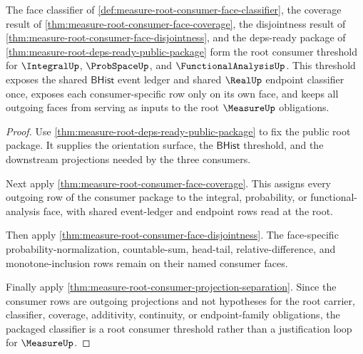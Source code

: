 \begin{theorem}
\label{thm:measure-root-cross-consumer-threshold-package}
The face classifier of
\autoref{def:measure-root-consumer-face-classifier}, the coverage result of
\autoref{thm:measure-root-consumer-face-coverage}, the disjointness result of
\autoref{thm:measure-root-consumer-face-disjointness}, and the deps-ready
package of \autoref{thm:measure-root-deps-ready-public-package} form the root
consumer threshold for $\IntegralUp$, $\ProbSpaceUp$, and
$\FunctionalAnalysisUp$. This threshold exposes the shared $\mathsf{BHist}$
event ledger and shared $\RealUp$ endpoint classifier once, exposes each
consumer-specific row only on its own face, and keeps all outgoing faces from
serving as inputs to the root $\MeasureUp$ obligations.
\end{theorem}
\begin{proof}
Use \autoref{thm:measure-root-deps-ready-public-package} to fix the public
root package. It supplies the orientation surface, the $\mathsf{BHist}$
threshold, and the downstream projections needed by the three consumers.

Next apply \autoref{thm:measure-root-consumer-face-coverage}. This assigns
every outgoing row of the consumer package to the integral, probability, or
functional-analysis face, with shared event-ledger and endpoint rows read at
the root.

Then apply \autoref{thm:measure-root-consumer-face-disjointness}. The
face-specific probability-normalization, countable-sum, head-tail,
relative-difference, and monotone-inclusion rows remain on their named
consumer faces.

Finally apply
\autoref{thm:measure-root-consumer-projection-separation}. Since the
consumer rows are outgoing projections and not hypotheses for the root
carrier, classifier, coverage, additivity, continuity, or endpoint-family
obligations, the packaged classifier is a root consumer threshold rather than
a justification loop for $\MeasureUp$.
\end{proof}
